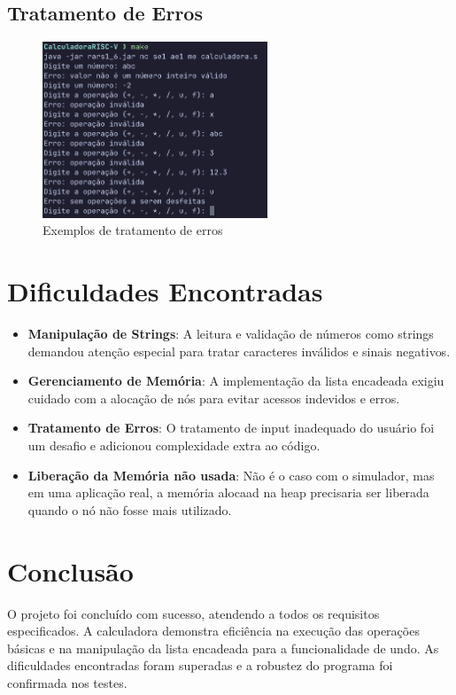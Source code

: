 \documentclass[12pt]{article}
\begin{document}
\subsection{Tratamento de Erros}

\begin{figure}[H]
	\centering
	\includegraphics[width=0.6\textwidth]{images/error_handling.png}
	\caption{Exemplos de tratamento de erros}
\end{figure}

\section{Dificuldades Encontradas}
\begin{itemize}
	\item \textbf{Manipulação de Strings}: A leitura e validação de
		números como strings demandou atenção especial para tratar
		caracteres inválidos e sinais negativos.
	\item \textbf{Gerenciamento de Memória}: A implementação da lista
		encadeada exigiu cuidado com a alocação de nós para
		evitar acessos indevidos e erros.
	\item \textbf{Tratamento de Erros}: O tratamento de input
		inadequado do usuário foi um desafio e adicionou complexidade
		extra ao código.
	\item \textbf{Liberação da Memória não usada}: Não é o caso com
        o simulador, mas em uma aplicação real, a memória alocaad na
        heap precisaria ser liberada quando o nó não fosse
        mais utilizado.
\end{itemize}

\section{Conclusão}
O projeto foi concluído com sucesso, atendendo a todos os requisitos
especificados. A calculadora demonstra eficiência na execução das
operações básicas e na manipulação da lista encadeada para a
funcionalidade de undo. As dificuldades encontradas foram superadas
e a robustez do programa foi confirmada nos testes.
\end{document}
